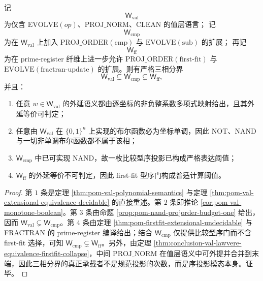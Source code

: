 \begin{theorem}[序投影阈值三相定理]\label{thm:conclusion-order-projection-three-phase-trichotomy}
记
\[
\mathsf W_{\mathrm{val}}
\]
为仅含 \(\mathrm{EVOLVE}(op)\)、\(\mathrm{PROJ\_NORM}\)、\(\mathrm{CLEAN}\) 的值层语言；
记
\[
\mathsf W_{\mathrm{cmp}}
\]
为在 \(\mathsf W_{\mathrm{val}}\) 上加入 \(\mathrm{PROJ\_ORDER}(\mathrm{cmp})\) 与 \(\mathrm{EVOLVE}(\mathrm{sub})\) 的扩展；
再记
\[
\mathsf W_{\mathrm{ff}}
\]
为在 prime-register 纤维上进一步允许 \(\mathrm{PROJ\_ORDER}(\mathrm{first\mbox{-}fit})\) 与 \(\mathrm{EVOLVE}(\mathrm{fractran\mbox{-}update})\) 的扩展。则有严格三相分界
\[
\mathsf W_{\mathrm{val}}
\subsetneq
\mathsf W_{\mathrm{cmp}}
\subsetneq
\mathsf W_{\mathrm{ff}},
\]
并且：
\begin{enumerate}
\normalfont
  \item 任意 \(w\in\mathsf W_{\mathrm{val}}\) 的外延语义都由逐坐标的非负整系数多项式映射给出，且其外延等价可判定；
  \item 任意由 \(\mathsf W_{\mathrm{val}}\) 在 \(\{0,1\}^n\) 上实现的布尔函数必为坐标单调，因此 \(\mathrm{NOT}\)、\(\mathrm{NAND}\) 与一切非单调布尔函数都不属于该相；
  \item \(\mathsf W_{\mathrm{cmp}}\) 中已可实现 \(\mathrm{NAND}\)，故一枚比较型序投影已构成严格表达阈值；
  \item \(\mathsf W_{\mathrm{ff}}\) 的外延等价不可判定，因此 first-fit 型序门构成普适计算阈值。
\end{enumerate}
\end{theorem}
\begin{proof}
第 \(1\) 条是定理 \ref{thm:pom-val-polynomial-semantics} 与定理 \ref{thm:pom-val-extensional-equivalence-decidable} 的直接重述。第 \(2\) 条即推论 \ref{cor:pom-val-monotone-boolean}。第 \(3\) 条由命题 \ref{prop:pom-nand-projorder-budget-one} 给出，因而 \(\mathsf W_{\mathrm{val}}\subsetneq \mathsf W_{\mathrm{cmp}}\)。第 \(4\) 条由定理 \ref{thm:pom-firstfit-extensional-undecidable} 与 FRACTRAN 的 prime-register 编译给出；结合 \(\mathsf W_{\mathrm{cmp}}\) 仅提供比较型序门而不含 first-fit 选择，可知 \(\mathsf W_{\mathrm{cmp}}\subsetneq \mathsf W_{\mathrm{ff}}\)。另外，由定理 \ref{thm:conclusion-val-lawvere-equivalence-firstfit-collapse}，中间 \(\mathrm{PROJ\_NORM}\) 在值层语义中可外提并合并到末端，因此三相分界的真正承载者不是规范投影的次数，而是序投影模态本身。证毕。
\end{proof}

